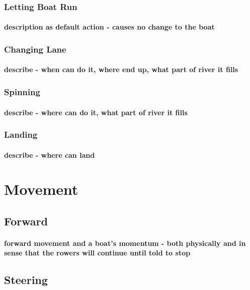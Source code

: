       \subsubsection{Letting Boat Run}
        \paragraph{description as default action - causes no change to the boat}
      \subsubsection{Changing Lane}
        \paragraph{describe - when can do it, where end up, what part of river it fills}
      \subsubsection{Spinning}
        \paragraph{describe - where can do it, what part of river it fills}
      \subsubsection{Landing}
        \paragraph{describe - where can land}
    
  \section{Movement}
    \subsection{Forward}
      \paragraph{forward movement and a boat's momentum - both physically and in sense that the rowers will continue until told to stop}
    \subsection{Steering}
